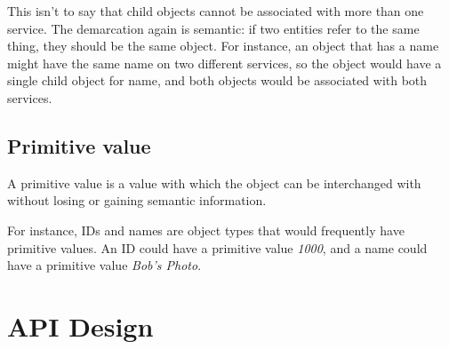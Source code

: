 \documentclass{report}
\begin{document}
			This isn't to say that child objects cannot be associated with more 
			than one service. The demarcation again is semantic: if two 
			entities refer to the same thing, they should be the same object.
			For instance, an object that has a name might have the same name on 
			two different services, so the object would have a single child 
			object for name, and both objects would be associated with both 
			services.

		\subsection{Primitive value} 

			A primitive value is a value with which the object can be 
			interchanged with without losing or gaining semantic information.

			For instance, IDs and names are object types that would frequently 
			have primitive values. An ID could have a primitive value 
			\emph{1000}, and a name could have a primitive value \emph{Bob's 
			  Photo}.

	
	\section{API Design}
\end{document}
